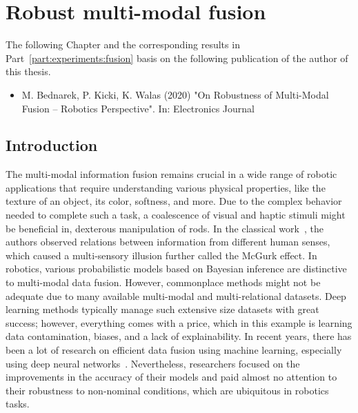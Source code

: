 \documentclass[a4paper, 10pt, twoside]{report}
\begin{document}
\chapter{Robust multi-modal fusion}
\label{part:methods:fusion}

\begin{notefromauthor}
    The following Chapter and the corresponding results in Part~\ref{part:experiments:fusion} basis on the following publication of the author of this thesis. 
    
    \begin{itemize}
        \item M. Bednarek, P. Kicki, K. Walas (2020) "On Robustness of Multi-Modal Fusion -- Robotics Perspective". In: Electronics Journal

    \end{itemize}
\end{notefromauthor}

\section{Introduction}
\label{part:methods:fusion:introduction}

The multi-modal information fusion remains crucial in a wide range of robotic applications that require understanding various physical properties, like the texture of an object, its color, softness, and more. Due to the complex behavior needed to complete such a task, a coalescence of visual and haptic stimuli might be beneficial in, \eg dexterous manipulation of rods. In the classical work~\cite{mcgurk_76}, the authors observed relations between information from different human senses, which caused a multi-sensory illusion further called the McGurk effect. In robotics, various probabilistic models based on Bayesian inference are distinctive to multi-modal data fusion. However, commonplace methods might not be adequate due to many available multi-modal and multi-relational datasets. Deep learning methods typically manage such extensive size datasets with great success; however, everything comes with a price, which in this example is learning data contamination, biases, and a lack of explainability. In recent years, there has been a lot of research on efficient data fusion using machine learning, especially using deep neural networks~\cite{survey_morrency}. Nevertheless, researchers focused on the improvements in the accuracy of their models and paid almost no attention to their robustness to non-nominal conditions, which are ubiquitous in robotics tasks.
\end{document}
